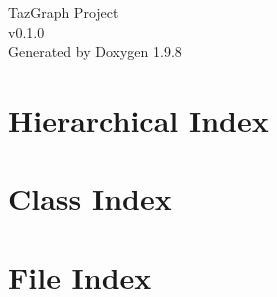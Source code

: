\documentclass[twoside]{book}
\newcommand{\+}{\discretionary{\mbox{\scriptsize$\hookleftarrow$}}{}{}}
\newcommand{\clearemptydoublepage}{%
    \newpage{\pagestyle{empty}\cleardoublepage}%
  }
\begin{document}
  \raggedbottom
    \hypersetup{pageanchor=false,
                bookmarksnumbered=true,
                pdfencoding=unicode
               }
  \begin{titlepage}
  \vspace*{7cm}
  \begin{center}%
  {\Large Taz\+Graph Project}\\
  [1ex]\large v0.\+1.\+0 \\
  \vspace*{1cm}
  {\large Generated by Doxygen 1.9.8}\\
  \end{center}
  \end{titlepage}
  \clearemptydoublepage
  \tableofcontents
  \clearemptydoublepage
  \hypersetup{pageanchor=true}


\chapter{Hierarchical Index}

\chapter{Class Index}

\chapter{File Index}

\end{document}
